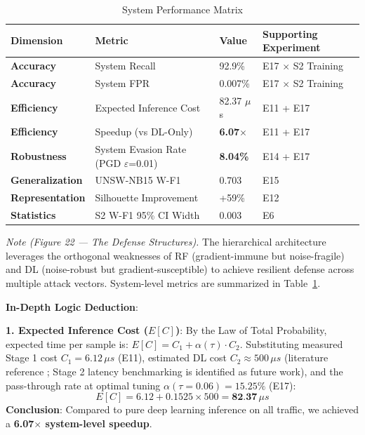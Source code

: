 \documentclass[sigconf]{acmart}
\begin{document}
\begin{table}[!t]
\caption{System Performance Matrix}
\label{tab:system_perf}
\begin{tabular}{p{2.8cm}p{5.5cm}p{2.5cm}p{5.6cm}}
\toprule
\textbf{Dimension} & \textbf{Metric} & \textbf{Value} & \textbf{Supporting Experiment} \\
\midrule
\textbf{Accuracy} & System Recall & 92.9\% & E17 $\times$ S2 Training \\
\textbf{Accuracy} & System FPR & 0.007\% & E17 $\times$ S2 Training \\
\textbf{Efficiency} & Expected Inference Cost & 82.37 $\mu$s & E11 + E17 \\
\textbf{Efficiency} & Speedup (vs DL-Only) & \textbf{6.07$\times$} & E11 + E17 \\
\textbf{Robustness} & System Evasion Rate (PGD $\varepsilon$=0.01) & \textbf{8.04\%} & E14 + E17 \\
\textbf{Generalization} & UNSW-NB15 W-F1 & 0.703 & E15 \\
\textbf{Representation} & Silhouette Improvement & +59\% & E12 \\
\textbf{Statistics} & S2 W-F1 95\% CI Width & 0.003 & E6 \\
\bottomrule
\end{tabular}
\end{table}

\textit{Note (Figure 22 --- The Defense Structures).} The hierarchical architecture leverages the orthogonal weaknesses of RF (gradient-immune but noise-fragile) and DL (noise-robust but gradient-susceptible) to achieve resilient defense across multiple attack vectors. System-level metrics are summarized in Table~\ref{tab:system_perf}.

\textbf{In-Depth Logic Deduction}:

\textbf{1. Expected Inference Cost ($E[C]$)}: By the Law of Total Probability, expected time per sample is: $E[C] = C_1 + \alpha(\tau) \cdot C_2$.
Substituting measured Stage 1 cost $C_1 = 6.12\,\mu s$ (E11), estimated DL cost $C_2 \approx 500\,\mu s$ (literature reference \cite{6}; Stage 2 latency benchmarking is identified as future work), and the pass-through rate at optimal tuning $\alpha(\tau=0.06) = 15.25\%$ (E17):
$$E[C] = 6.12 + 0.1525 \times 500 = \textbf{82.37}\,\mu s$$
\textbf{Conclusion}: Compared to pure deep learning inference on all traffic, we achieved a \textbf{6.07$\times$ system-level speedup}.
\end{document}
